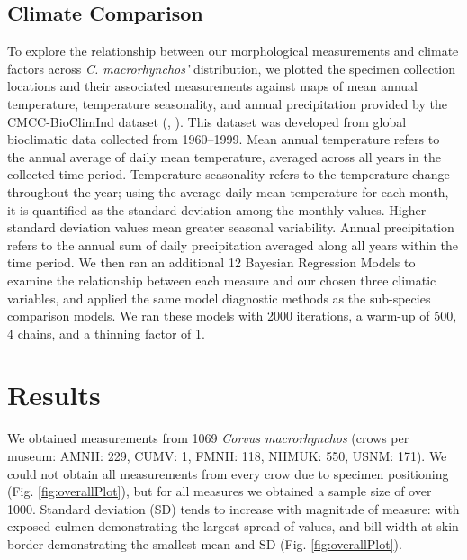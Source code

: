 \documentclass[10pt,a4paper]{article}
\begin{document}
\subsection{Climate Comparison}\label{climate-comparison}

To explore the relationship between our morphological measurements and climate factors across \emph{C. macrorhynchos'} distribution, we plotted the specimen collection locations and their associated measurements against maps of mean annual temperature, temperature seasonality, and annual precipitation provided by the CMCC-BioClimInd dataset (, ).
This dataset was developed from global bioclimatic data collected from 1960--1999.
Mean annual temperature refers to the annual average of daily mean temperature, averaged across all years in the collected time period.
Temperature seasonality refers to the temperature change throughout the year; using the average daily mean temperature for each month, it is quantified as the standard deviation among the monthly values.
Higher standard deviation values mean greater seasonal variability.
Annual precipitation refers to the annual sum of daily precipitation averaged along all years within the time period.
We then ran an additional 12 Bayesian Regression Models to examine the relationship between each measure and our chosen three climatic variables, and applied the same model diagnostic methods as the sub-species comparison models.
We ran these models with 2000 iterations, a warm-up of 500, 4 chains, and a thinning factor of 1.

\section{Results}\label{results}

We obtained measurements from 1069 \emph{Corvus macrorhynchos} (crows per museum: AMNH: 229, CUMV: 1, FMNH: 118, NHMUK: 550, USNM: 171).
We could not obtain all measurements from every crow due to specimen positioning (Fig. \ref{fig:overallPlot}), but for all measures we obtained a sample size of over 1000.
Standard deviation (SD) tends to increase with magnitude of measure: with exposed culmen demonstrating the largest spread of values, and bill width at skin border demonstrating the smallest mean and SD (Fig. \ref{fig:overallPlot}).
\end{document}
